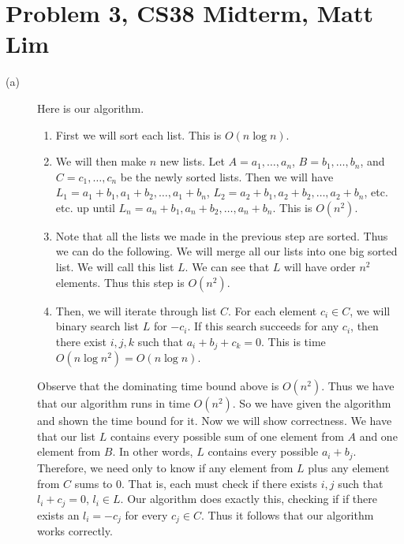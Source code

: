 \documentclass{article}
\begin{document}
\section*{Problem 3, CS38 Midterm, Matt Lim}
\begin{description}
    \item[(a)]
        Here is our algorithm.
        \begin{enumerate}
            \item First we will sort each list. This is $O(n\log n)$.
            \item We will then make $n$ new lists. Let $A = a_1, \dots, a_n$,
                $B = b_1, \dots, b_n$, and $C = c_1, \dots, c_n$ be the newly sorted
                lists. Then we will have $L_1 = a_1 + b_1, a_1 + b_2, \dots, a_1
                + b_n$, $L_2 = a_2 + b_1, a_2 + b_2, \dots, a_2 + b_n$, etc.
                etc. up until $L_n = a_n + b_1, a_n + b_2, \dots, a_n + b_n$.
                This is $O(n^2)$.
            \item Note that all the lists we made in the previous step are
                sorted. Thus we can do the following.
                We will merge all our lists into one big sorted list. We
                will call this list $L$. We can see that $L$ will have order
                $n^2$ elements. Thus this step is $O(n^2)$.
            \item Then, we will iterate through list $C$. For each element $c_i
                \in C$, we will binary search list $L$ for $-c_i$. If this
                search succeeds for any $c_i$, then there exist $i,j,k$ such that
                $a_i + b_j + c_k = 0$. This is time $O(n\log n^2) =
                O(n\log n)$.
        \end{enumerate}
        Observe that the dominating time bound above is $O(n^2)$. Thus we have
        that our algorithm runs in time $O(n^2)$.
        So we have given the algorithm and shown the time bound for it. Now we
        will show correctness. We have that our list $L$ contains every possible
        sum of one element from $A$ and one element from $B$. In other words,
        $L$ contains every possible $a_i + b_j$. Therefore, we need only to know
        if any element from $L$ plus any element from $C$ sums to $0$. That is,
        each must check if there exists $i,j$ such that $l_i + c_j = 0$, $l_i
        \in L$. Our algorithm does exactly this, checking if if there exists an
        $l_i = -c_j$ for every $c_j \in C$. Thus it follows that our algorithm
        works correctly.

\end{description}
\end{document}
